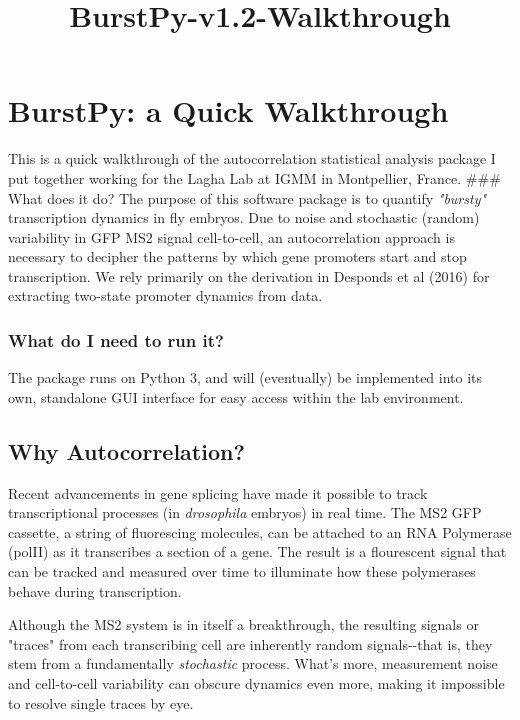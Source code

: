 \documentclass[11pt]{article}
\title{BurstPy-v1.2-Walkthrough}
\begin{document}
    
    
    \maketitle
    
    

    
    \section{BurstPy: a Quick
Walkthrough}\label{burstpy-a-quick-walkthrough}

This is a quick walkthrough of the autocorrelation statistical analysis
package I put together working for the Lagha Lab at IGMM in Montpellier,
France. \#\#\# What does it do? The purpose of this software package is
to quantify \emph{"bursty"} transcription dynamics in fly embryos. Due
to noise and stochastic (random) variability in GFP MS2 signal
cell-to-cell, an autocorrelation approach is necessary to decipher the
patterns by which gene promoters start and stop transcription. We rely
primarily on the derivation in Desponds et al (2016) for extracting
two-state promoter dynamics from data.

\subsubsection{What do I need to run
it?}\label{what-do-i-need-to-run-it}

The package runs on Python 3, and will (eventually) be implemented into
its own, standalone GUI interface for easy access within the lab
environment.

    \subsection{Why Autocorrelation?}\label{why-autocorrelation}

Recent advancements in gene splicing have made it possible to track
transcriptional processes (in \emph{drosophila} embryos) in real time.
The MS2 GFP cassette, a string of fluorescing molecules, can be attached
to an RNA Polymerase (polII) as it transcribes a section of a gene. The
result is a flourescent signal that can be tracked and measured over
time to illuminate how these polymerases behave during transcription.

Although the MS2 system is in itself a breakthrough, the resulting
signals or "traces" from each transcribing cell are inherently random
signals-\/-that is, they stem from a fundamentally \emph{stochastic}
process. What's more, measurement noise and cell-to-cell variability can
obscure dynamics even more, making it impossible to resolve single
traces by eye.
\end{document}
